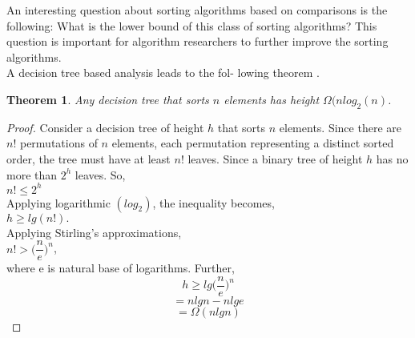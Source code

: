 An interesting question about sorting algorithms based on comparisons is the following: What is the lower bound of this class of sorting algorithms? This question is important for algorithm researchers to further improve the sorting algorithms.\\
\indent A decision tree based analysis leads to the fol- lowing theorem \cite{cormen}.
\newtheorem{theorem}{Theorem}
\begin{theorem}
Any decision tree that sorts $n$ elements has height $\Omega(n log_2(n)$.
\end{theorem}
\begin{proof}
Consider a decision tree of height $h$ that sorts $n$ elements. Since there are $n!$ permutations of $n$ elements, each permutation representing a distinct sorted order, the tree must have at least $n!$ leaves. Since a binary tree of height $h$ has no more than $2^h$ leaves. So,\\
$n! \leq 2^h$\\
Applying logarithmic $(log_2)$, the inequality becomes,\\
$h \geq lg(n!).$\\
Applying Stirling’s approximations,\\
$n! > \Bigg(\dfrac{n}{e}\Bigg)^n$,\\
where e is natural base of logarithms. Further,
$$h \geq lg\Bigg(\dfrac{n}{e}\Bigg)^n$$
$$=n lg n - n lg e$$
$$=\Omega(n lg n)$$
\end{proof}